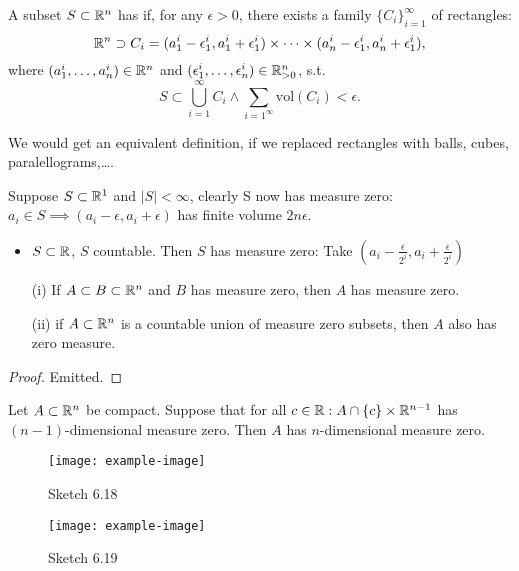 \begin{definition*}
    A subset $S\subset \mathbb{R}^n$ has  if, for any \(\epsilon>0\), there exists a family 
    \(\{C_i\}_{i=1}^\infty\) of rectangles:
    \[\mathbb{R}^n\supset C_i = (a_1^i-\epsilon_1^i,a_1^i+\epsilon_1^i)\times\dots\times (a_n^i-\epsilon_1^i,a_n^i+\epsilon_1^i),\]
    where \((a_1^i,\dots,a_n^i)\in\mathbb{R}^n\) and \((\epsilon_1^i,\dots,\epsilon_n^i)\in\mathbb{R}_{>0}^n\), s.t. 
    \[S\subset \bigcup_{i=1}^\infty C_i\land \sum_{i=1^\infty} \text{vol}(C_i)<\epsilon.\] 
\end{definition*}

\begin{remark}
    We would get an equivalent definition, if we replaced rectangles with balls, cubes, paralellograms,\dots.
\end{remark}

\begin{example}
    Suppose \(S\subset\mathbb{R}^1\) and \(|S|<\infty\), clearly S now has measure zero: \(a_i\in S\implies (a_i-\epsilon,a_i+\epsilon)\) has finite volume \(2n\epsilon\).
    \begin{itemize}
        \item \(S\subset\mathbb{R}\), \(S\) countable. Then \(S\) has measure zero: Take \((a_i-\frac{\epsilon}{2^i},a_i+\frac{\epsilon}{2^i})\)
    \end{itemize}
\end{example}

\begin{lemma}\label{lem:6.3}
    \begin{enumerate}
        \item[(i)] If \(A\subset B\subset\mathbb{R}^n\) and \(B\) has measure zero, then \(A\) has measure zero. 
        \item[(ii)] if \(A\subset\mathbb{R}^n\) is a countable union of measure zero subsets, then \(A\) also has zero measure.   
    \end{enumerate}
\end{lemma}

\begin{proof}
    Emitted.
\end{proof}

\begin{lemma}\label{lem:6.4}
    Let \(A\subset \mathbb{R}^n\) be compact. Suppose that for all \(c\in\mathbb{R}:A\cap\{c\}\times \mathbb{R}^{n-1}\)
    has \((n-1)\)-dimensional measure zero. Then \(A\) has \(n\)-dimensional measure zero. 
    \begin{figure}[H]\label{fig:6.18}
        \centering
        \texttt{[image: example-image]}
        \caption{Sketch 6.18}
    \end{figure}
    \begin{figure}[H]\label{fig:6.19}
        \centering
        \texttt{[image: example-image]}
        \caption{Sketch 6.19}
    \end{figure}
\end{lemma}

